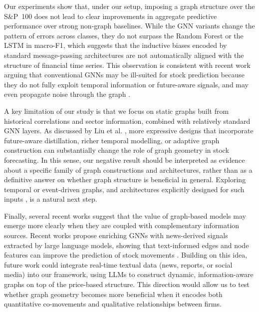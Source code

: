 \documentclass{article}
\begin{document}
Our experiments show that, under our setup, imposing a graph structure over the S\&P~100 does not lead to clear improvements in aggregate predictive performance over strong non-graph baselines. While the GNN variants change the pattern of errors across classes, they do not surpass the Random Forest or the LSTM in macro-F1, which suggests that the inductive biases encoded by standard message-passing architectures are not automatically aligned with the structure of financial time series. This observation is consistent with recent work arguing that conventional GNNs may be ill-suited for stock prediction because they do not fully exploit temporal information or future-aware signals, and may even propagate noise through the graph \cite{limitations_of_standard_gnn_stock_prediction}.

A key limitation of our study is that we focus on static graphs built from historical correlations and sector information, combined with relatively standard GNN layers. As discussed by Liu et al. \cite{limitations_of_standard_gnn_stock_prediction}, more expressive designs that incorporate future-aware distillation, richer temporal modelling, or adaptive graph construction can substantially change the role of graph geometry in stock forecasting. In this sense, our negative result should be interpreted as evidence about a specific family of graph constructions and architectures, rather than as a definitive answer on whether graph structure is beneficial in general. Exploring temporal or event-driven graphs, and architectures explicitly designed for such inputs \cite{survey_temporal_gnn,temporal_gnn_stock_prediction}, is a natural next step.

Finally, several recent works suggest that the value of graph-based models may emerge more clearly when they are coupled with complementary information sources. Recent works propose enriching GNNs with news-derived signals extracted by large language models, showing that text-informed edges and node features can improve the prediction of stock movements \cite{chatgpt_gnn_stock_prediction}. Building on this idea, future work could integrate real-time textual data (news, reports, or social media) into our framework, using LLMs to construct dynamic, information-aware graphs on top of the price-based structure. This direction would allow us to test whether graph geometry becomes more beneficial when it encodes both quantitative co-movements and qualitative relationships between firms.

\newpage
\end{document}
